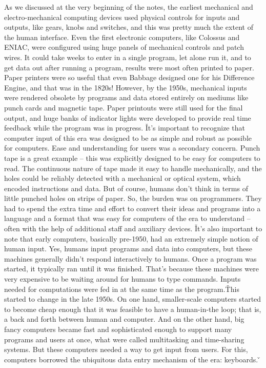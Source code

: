 As we discussed at the very beginning of the notes, the earliest mechanical and electro-mechanical computing devices
used physical controls for inputs and outputs, like gears, knobs and switches, and this was pretty much the extent of
the human interface. Even the first electronic computers, like Colossus and ENIAC, were configured using huge panels
of mechanical controls and patch wires. It could take weeks to enter in a single program, let alone run it, and to
get data out after running a program, results were most often printed to paper. Paper printers were so useful that
even Babbage designed one for his Difference Engine, and that was in the 1820s! However, by the 1950s, mechanical
inputs were rendered obsolete by programs and data stored entirely on mediums like punch cards and magnetic tape.
Paper printouts were still used for the final output, and huge banks of indicator lights were developed to provide
real time feedback while the program was in progress. \v

It's important to recognize that computer input of this era was designed to be as simple and robust as possible for
computers. Ease and understanding for users was a secondary concern. Punch tape is a great example – this was
explicitly designed to be easy for computers to read. The continuous nature of tape made it easy to handle
mechanically, and the holes could be reliably detected with a mechanical or optical system, which encoded
instructions and data. But of course, humans don't think in terms of little punched holes on strips of paper. So, the
burden was on programmers. They had to spend the extra time and effort to convert their ideas and programs into a
language and a format that was easy for computers of the era to understand – often with the help of additional staff
and auxiliary devices. \v

It's also important to note that early computers, basically pre-1950, had an extremely simple notion of human input.
Yes, humans input programs and data into computers, but these machines generally didn't respond interactively to
humans. Once a program was started, it typically ran until it was finished. That's because these machines were very
expensive to be waiting around for humans to type commands. Inputs needed for computations were fed in at the same time
as the program.\v

This started to change in the late 1950s. On one hand, smaller-scale computers started to become cheap enough that it
was feasible to have a human-in-the loop; that is, a back and forth between human and computer. And on the other
hand, big fancy computers became fast and sophisticated enough to support many programs and users at once, what were
called multitasking and time-sharing systems. But these computers needed a way to get input from users. For this,
computers borrowed the ubiquitous data entry mechanism of the era: keyboards. \v

